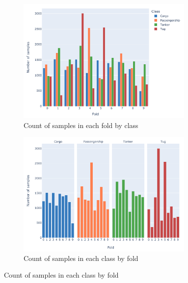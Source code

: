 \begin{figure}[htbp]
    \centering
    \begin{subfigure}[t]{\textwidth}
        \centering
        \includegraphics[width=0.95\textwidth]{img/ch3/10_folds_counts.pdf}
        \caption{Count of samples in each fold by class}
        \label{fig:10-fold-counts}
    \end{subfigure}

    \vspace{1cm}
    
    \begin{subfigure}[t]{\textwidth}
        \centering
        \includegraphics[width=0.95\textwidth]{img/ch3/10_fold_counts_facet.pdf}
        \caption{Count of samples in each class by fold}
        \label{fig:10-fold-counts-facet}
    \end{subfigure}
    \vfill
\end{figure}
